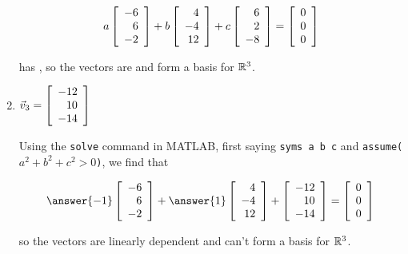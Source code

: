 \documentclass{ximera}
\begin{document}
\begin{exercise}
\begin{enumerate}
\begin{problem}
        \begin{equation*}
        a\startmat{r} -6 \\ 6 \\ -2\stopmat + b\startmat{r} 4 \\ -4 \\ 12\stopmat + c\startmat{r} 6 \\ 2 \\ -8\stopmat = \startmat{r} 0 \\ 0 \\ 0\stopmat
        \end{equation*}

        has , so the vectors are  and  form a basis for $\R^3$.

    \end{problem}

    \item $\vect{v}_3 = \startmat{r} -12 \\ 10 \\ -14\stopmat$ 

    
    \begin{problem}
    
        Using the \texttt{solve} command in MATLAB, first saying \texttt{syms a b c} and \texttt{assume($a^2+b^2+c^2>0$)}, we find that

        \begin{equation*}
        \answer{-1}\startmat{r} -6 \\ 6 \\ -2\stopmat + \answer{1}\startmat{r} 4 \\ -4 \\ 12\stopmat + \startmat{r} -12 \\ 10 \\ -14\stopmat = \startmat{r} 0 \\ 0 \\ 0\stopmat
        \end{equation*}

        so the vectors are linearly dependent and can't form a basis for $\R^3$.

    \end{problem}

    \end{enumerate}

\end{exercise}
\end{document}
